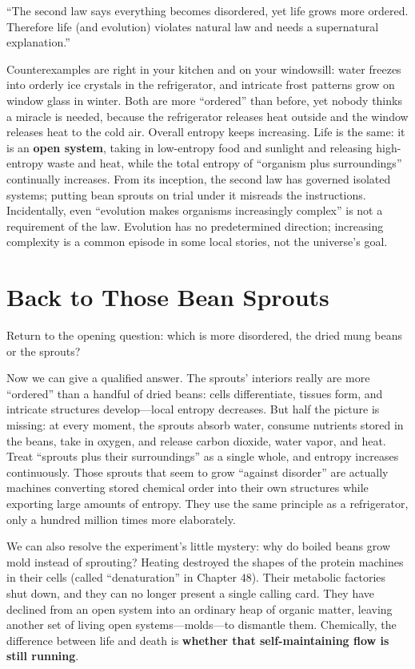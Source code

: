 \begin{wuqu}
``The second law says everything becomes disordered, yet life grows more ordered. Therefore life (and evolution) violates natural law and needs a supernatural explanation.''

Counterexamples are right in your kitchen and on your windowsill: water freezes into orderly ice crystals in the refrigerator, and intricate frost patterns grow on window glass in winter. Both are more ``ordered'' than before, yet nobody thinks a miracle is needed, because the refrigerator releases heat outside and the window releases heat to the cold air. Overall entropy keeps increasing. Life is the same: it is an \textbf{open system}, taking in low-entropy food and sunlight and releasing high-entropy waste and heat, while the total entropy of ``organism plus surroundings'' continually increases. From its inception, the second law has governed isolated systems; putting bean sprouts on trial under it misreads the instructions. Incidentally, even ``evolution makes organisms increasingly complex'' is not a requirement of the law. Evolution has no predetermined direction; increasing complexity is a common episode in some local stories, not the universe's goal.
\end{wuqu}

\section{Back to Those Bean Sprouts}

Return to the opening question: which is more disordered, the dried mung beans or the sprouts?

Now we can give a qualified answer. The sprouts' interiors really are more ``ordered'' than a handful of dried beans: cells differentiate, tissues form, and intricate structures develop---local entropy decreases. But half the picture is missing: at every moment, the sprouts absorb water, consume nutrients stored in the beans, take in oxygen, and release carbon dioxide, water vapor, and heat. Treat ``sprouts plus their surroundings'' as a single whole, and entropy increases continuously. Those sprouts that seem to grow ``against disorder'' are actually machines converting stored chemical order into their own structures while exporting large amounts of entropy. They use the same principle as a refrigerator, only a hundred million times more elaborately.

We can also resolve the experiment's little mystery: why do boiled beans grow mold instead of sprouting? Heating destroyed the shapes of the protein machines in their cells (called ``denaturation'' in Chapter 48). Their metabolic factories shut down, and they can no longer present a single calling card. They have declined from an open system into an ordinary heap of organic matter, leaving another set of living open systems---molds---to dismantle them. Chemically, the difference between life and death is \textbf{whether that self-maintaining flow is still running}.

